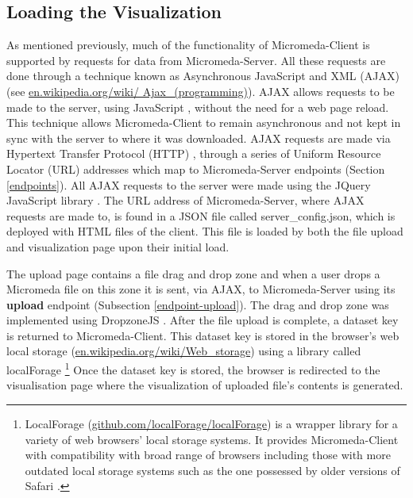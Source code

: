 \subsection{Loading the Visualization}

As mentioned previously, much of the functionality of Micromeda-Client is supported by requests for data from Micromeda-Server. All these requests are done through a technique known as Asynchronous JavaScript and XML (AJAX) \cite{garrett2005ajax,li2012jquery} (see \href{en.wikipedia.org/wiki/Ajax\_(programming)}{en.wikipedia.org/wiki/ Ajax\_(programming)}). AJAX allows requests to be made to the server, using JavaScript \cite{flanagan2006javascript}, without the need for a web page reload. This technique allows Micromeda-Client to remain asynchronous and not kept in sync with the server to where it was downloaded. AJAX requests are made via Hypertext Transfer Protocol (HTTP) \cite{fielding1999hypertext}, through a series of Uniform Resource Locator (URL) addresses \cite{berners1994rfc} which map to Micromeda-Server endpoints (Section \ref{endpoints}). All AJAX requests to the server were made using the JQuery JavaScript library \cite{chaffer2013learning,li2012jquery}. The URL address of Micromeda-Server, where AJAX requests are made to, is found in a JSON file called server\_config.json, which is deployed with HTML files of the client. This file is loaded by both the file upload and visualization page upon their initial load.

The upload page contains a file drag and drop zone and when a user drops a Micromeda file on this zone it is sent, via AJAX, to Micromeda-Server using its \textbf{upload} endpoint (Subsection \ref{endpoint-upload}). The drag and drop zone was implemented using DropzoneJS \cite{meno}. After the file upload is complete, a dataset key is returned to Micromeda-Client. This dataset key is stored in the browser's web local storage \cite{Hickson} (\href{en.wikipedia.org/wiki/Web\_storage}{en.wikipedia.org/wiki/Web\_storage}) using a library called localForage \cite{localforage} \footnote{LocalForage (\href{github.com/localForage/localForage}{github.com/localForage/localForage}) is a wrapper library for a variety of web browsers' local storage systems. It provides Micromeda-Client with compatibility with broad range of browsers including those with more outdated local storage systems such as the one possessed by older versions of Safari \cite{lawson_2014}.} Once the dataset key is stored, the browser is redirected to the visualisation page where the visualization of uploaded file's contents is generated.

